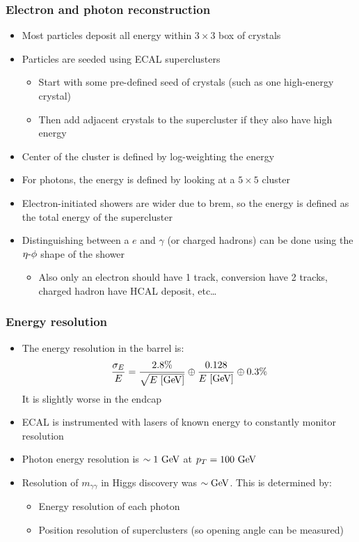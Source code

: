 \subsubsection{Electron and photon reconstruction}
\begin{itemize}
  \item Most particles deposit all energy within $3\times 3$ box of crystals
  \item Particles are seeded using ECAL superclusters
  \begin{itemize}
    \item Start with some pre-defined seed of crystals (such as one high-energy crystal)
    \item Then add adjacent crystals to the supercluster if they also have high energy
  \end{itemize}
  \item Center of the cluster is defined by log-weighting the energy
  \item For photons, the energy is defined by looking at a $5\times5$ cluster
  \item Electron-initiated showers are wider due to brem, so the energy is defined as the total energy of the supercluster
  \item Distinguishing between a $e$ and $\gamma$ (or charged hadrons) can be done using the $\eta\textto\phi$ shape of the shower
  \begin{itemize}
    \item Also only an electron should have 1 track, conversion have 2 tracks, charged hadron have HCAL deposit, etc\dots
  \end{itemize}
\end{itemize}

\subsubsection{Energy resolution}
\begin{itemize}
  \item The energy resolution in the barrel is:
  \begin{equation}
    \frac{\sigma_E}{E} = \frac{2.8\%}{\sqrt{E~[\text{GeV}]}}\oplus \frac{0.128}{E~[\text{GeV}]} \oplus 0.3\%
  \end{equation}
  It is slightly worse in the endcap
  \item ECAL is instrumented with lasers of known energy to constantly monitor resolution
  \item Photon energy resolution is $\sim1~\text{GeV}$ at $p_T = 100~\text{GeV}$
  \item Resolution of $m_{\gamma\gamma}$ in Higgs discovery was $\sim\text{GeV}$. This is determined by:
  \begin{itemize}
    \item Energy resolution of each photon
    \item Position resolution of superclusters (so opening angle can be measured)
  \end{itemize}
\end{itemize}

